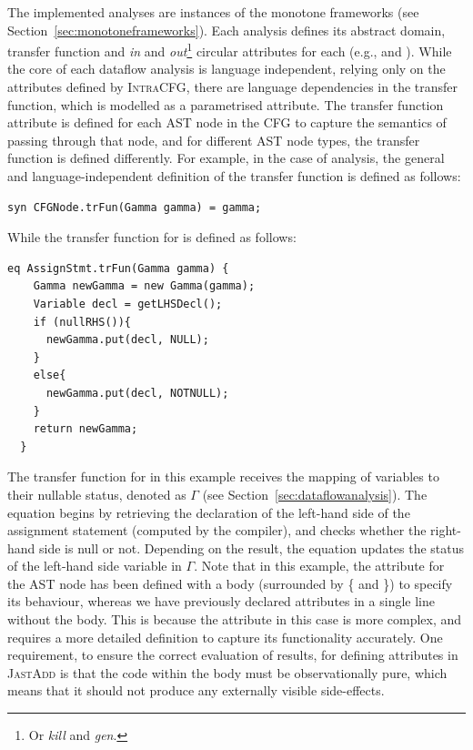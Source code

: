The implemented analyses are instances of the monotone frameworks (see Section~\ref{sec:monotoneframeworks}).
Each analysis defines its abstract domain, transfer function and \emph{in} and
\emph{out}\footnote{Or \emph{kill} and \emph{gen}.} circular attributes for each  (e.g.,  and  ).
While the core of each dataflow analysis is language independent, relying only on the
attributes defined by \textsc{IntraCFG}, there are language dependencies in the
transfer function, which is modelled as a parametrised attribute.
The transfer function attribute is defined for each AST node in the CFG to capture the semantics of passing
through that node, and for different AST node types, the transfer function is defined differently.
For example, in the case of  analysis,
the general and language-independent definition of the transfer function is
defined as follows:
\begin{lstlisting}[language=JastAdd]
  syn CFGNode.trFun(Gamma gamma) = gamma;
\end{lstlisting}
While the transfer function for  is defined as follows:
\begin{lstlisting}[language=JastAdd]
  eq AssignStmt.trFun(Gamma gamma) {
    Gamma newGamma = new Gamma(gamma);
    Variable decl = getLHSDecl();
    if (nullRHS()){
      newGamma.put(decl, NULL);
    }
    else{
      newGamma.put(decl, NOTNULL);
    }
    return newGamma;
  }
\end{lstlisting}
The transfer function for  in this example receives the
mapping of variables to their nullable status, denoted as $\Gamma$
(see Section~\ref{sec:dataflowanalysis}). The equation begins by retrieving the
declaration of the left-hand side of the assignment statement (computed by the compiler), and
checks whether the right-hand side is null or not.
Depending on the result, the equation updates the status of the left-hand side
variable in $\Gamma$.
Note that in this example, the attribute  for the AST node  has been defined with a
body (surrounded by \{ and \}) to specify its behaviour, whereas we have previously declared attributes in a
single line without the body. This is because the attribute in this case is more
complex, and requires a more detailed definition to capture its functionality accurately.
One requirement, to ensure the correct evaluation of results, for defining attributes in \textsc{JastAdd} is that the code
within the body must be observationally pure, which means that it
should not produce any externally visible side-effects.

